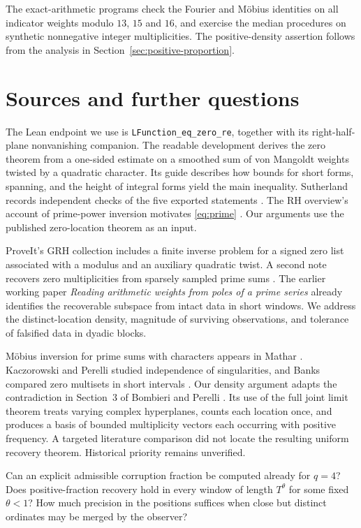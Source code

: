 \documentclass[11pt]{article}
\begin{document}
The exact-arithmetic programs check the Fourier and M\"obius identities on all indicator weights modulo $13$, $15$ and $16$, and exercise the median procedures on synthetic nonnegative integer multiplicities. The positive-density assertion follows from the analysis in Section~\ref{sec:positive-proportion}.

\section{Sources and further questions}
The Lean endpoint we use is \texttt{LFunction\_eq\_zero\_re}, together with its right-half-plane nonvanishing companion. The readable development derives the zero theorem from a one-sided estimate on a smoothed sum of von Mangoldt weights twisted by a quadratic character. Its guide describes how bounds for short forms, spanning, and the height of integral forms yield the main inequality. Sutherland records independent checks of the five exported statements \cite{lean,replay}. The RH overview's account of prime-power inversion motivates \eqref{eq:prime} \cite{wiki}. Our arguments use the published zero-location theorem as an input.

ProveIt's GRH collection includes a finite inverse problem for a signed zero list associated with a modulus and an auxiliary quadratic twist. A second note recovers zero multiplicities from sparsely sampled prime sums \cite{proveit}. The earlier working paper \emph{Reading arithmetic weights from poles of a prime series} \cite{previous} already identifies the recoverable subspace from intact data in short windows. We address the distinct-location density, magnitude of surviving observations, and tolerance of falsified data in dyadic blocks.

M\"obius inversion for prime sums with characters appears in Mathar \cite{mathar}. Kaczorowski and Perelli studied independence of singularities, and Banks compared zero multisets in short intervals \cite{kp,Banks}. Our density argument adapts the contradiction in Section~3 of Bombieri and Perelli \cite{BP}. Its use of the full joint limit theorem treats varying complex hyperplanes, counts each location once, and produces a basis of bounded multiplicity vectors each occurring with positive frequency. A targeted literature comparison did not locate the resulting uniform recovery theorem. Historical priority remains unverified.

Can an explicit admissible corruption fraction be computed already for $q=4$? Does positive-fraction recovery hold in every window of length $T^\theta$ for some fixed $\theta<1$? How much precision in the positions suffices when close but distinct ordinates may be merged by the observer?
\end{document}
